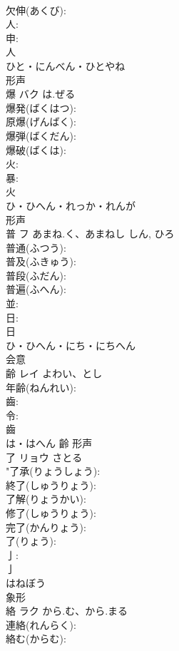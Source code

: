 \documentclass[8pt]{extreport}
\begin{document}
\begin{CJK}{UTF8}{min}
\\	欠伸(あくび): 
\\	人: 
\\	申: 
\\	人	
\\	ひと・にんべん・ひとやね	
\\	形声 
\\	爆	バク	は.ぜる		
\\	爆発(ばくはつ): 
\\	原爆(げんばく): 
\\	爆弾(ばくだん): 
\\	爆破(ばくは): 
\\	火: 
\\	暴: 
\\	火	
\\	ひ・ひへん・れっか・れんが	
\\	形声 
\\	普	フ	あまね.く、あまねし	しん, ひろ	
\\	普通(ふつう): 
\\	普及(ふきゅう): 
\\	普段(ふだん): 
\\	普遍(ふへん): 
\\	並: 
\\	日: 
\\	日	
\\	ひ・ひへん・にち・にちへん	
\\	会意 
\\	齢	レイ	よわい、とし		
\\	年齢(ねんれい): 
\\	齒: 
\\	令: 
\\	齒	
\\	は・はへん	齡	形声 
\\	了	リョウ		さとる	
\\	"了承(りょうしょう): 
\\	終了(しゅうりょう): 
\\	了解(りょうかい): 
\\	修了(しゅうりょう): 
\\	完了(かんりょう): 
\\	了(りょう): 
\\	亅: 
\\	亅	
\\	はねぼう	
\\	象形 
\\	絡	ラク	から.む、から.まる		
\\	連絡(れんらく): 
\\	絡む(からむ): 

\end{CJK}
\end{document}
